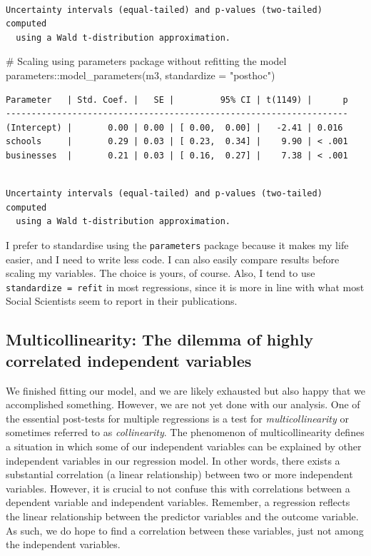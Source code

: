 \documentclass[
  letterpaper,
]{krantz}
\makeatletter
\newenvironment{Shaded}{\begin{snugshade}}{\end{snugshade}}
\newcommand{\AttributeTok}[1]{\textcolor[rgb]{0.40,0.45,0.13}{#1}}
\newcommand{\CommentTok}[1]{\textcolor[rgb]{0.37,0.37,0.37}{#1}}
\newcommand{\FunctionTok}[1]{\textcolor[rgb]{0.28,0.35,0.67}{#1}}
\newcommand{\NormalTok}[1]{\textcolor[rgb]{0.00,0.23,0.31}{#1}}
\newcommand{\SpecialCharTok}[1]{\textcolor[rgb]{0.37,0.37,0.37}{#1}}
\newcommand{\StringTok}[1]{\textcolor[rgb]{0.13,0.47,0.30}{#1}}
\newenvironment{kframe}{%
\medskip{}
\setlength{\fboxsep}{.8em}
 \def\at@end@of@kframe{}%
 \ifinner\ifhmode%
  \def\at@end@of@kframe{\end{minipage}}%
  \begin{minipage}{\columnwidth}%
 \fi\fi%
 \def\FrameCommand##1{\hskip\@totalleftmargin \hskip-\fboxsep
 \colorbox{shadecolor}{##1}\hskip-\fboxsep
     \hskip-\linewidth \hskip-\@totalleftmargin \hskip\columnwidth}%
 \MakeFramed {\advance\hsize-\width
   \@totalleftmargin\z@ \linewidth\hsize
   \@setminipage}}%
 {\par\unskip\endMakeFramed%
 \at@end@of@kframe}
\renewenvironment{Shaded}{\begin{kframe}}{\end{kframe}}
\makeatother
\begin{document}
\begin{verbatim}

Uncertainty intervals (equal-tailed) and p-values (two-tailed) computed
  using a Wald t-distribution approximation.
\end{verbatim}

\begin{Shaded}
\begin{Highlighting}[]
\CommentTok{\# Scaling using \textasciigrave{}parameters\textasciigrave{} package without refitting the model}
\NormalTok{parameters}\SpecialCharTok{::}\FunctionTok{model\_parameters}\NormalTok{(m3, }\AttributeTok{standardize =} \StringTok{"posthoc"}\NormalTok{)}
\end{Highlighting}
\end{Shaded}

\begin{verbatim}
Parameter   | Std. Coef. |   SE |         95% CI | t(1149) |      p
-------------------------------------------------------------------
(Intercept) |       0.00 | 0.00 | [ 0.00,  0.00] |   -2.41 | 0.016 
schools     |       0.29 | 0.03 | [ 0.23,  0.34] |    9.90 | < .001
businesses  |       0.21 | 0.03 | [ 0.16,  0.27] |    7.38 | < .001
\end{verbatim}

\begin{verbatim}

Uncertainty intervals (equal-tailed) and p-values (two-tailed) computed
  using a Wald t-distribution approximation.
\end{verbatim}

I prefer to standardise using the \texttt{parameters} package because it
makes my life easier, and I need to write less code. I can also easily
compare results before scaling my variables. The choice is yours, of
course. Also, I tend to use \texttt{standardize\ =\ refit} in most
regressions, since it is more in line with what most Social Scientists
seem to report in their publications.

\subsection{Multicollinearity: The dilemma of highly correlated
independent variables}\label{sec-multicollinearity}

We finished fitting our model, and we are likely exhausted but also
happy that we accomplished something. However, we are not yet done with
our analysis. One of the essential post-tests for multiple regressions
is a test for \emph{multicollinearity} or sometimes referred to as
\emph{collinearity}. The phenomenon of multicollinearity defines a
situation in which some of our independent variables can be explained by
other independent variables in our regression model. In other words,
there exists a substantial correlation (a linear relationship) between
two or more independent variables. However, it is crucial to not confuse
this with correlations between a dependent variable and independent
variables. Remember, a regression reflects the linear relationship
between the predictor variables and the outcome variable. As such, we do
hope to find a correlation between these variables, just not among the
independent variables.
\end{document}
